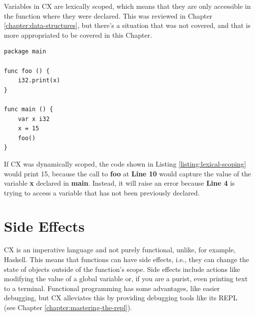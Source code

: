 \documentclass[11pt,fleqn,openany]{book} %
\begin{document}
Variables in CX are lexically scoped, which means that they are only accessible in the function where they were declared. This was reviewed in Chapter \ref{chapter:data-structures}, but there's a situation that was not covered, and that is more appropriated to be covered in this Chapter.

\begin{lstlisting}[caption={Lexical Scoping},captionpos=b,label={listing:lexical-scoping}]
package main

func foo () {
	i32.print(x)
}

func main () {
	var x i32
    x = 15
    foo()
}
\end{lstlisting}

If CX was dynamically scoped, the code shown in Listing \ref{listing:lexical-scoping} would print 15, because the call to \textbf{foo} at \textbf{Line 10} would capture the value of the variable \textbf{x} declared in \textbf{main}. Instead, it will raise an error because \textbf{Line 4} is trying to access a variable that has not been previously declared.

\section{Side Effects}


CX is an imperative language and not purely functional, unlike, for example, Haskell. This means that functions can have side effects, i.e., they can change the state of objects outside of the function's scope. Side effects include actions like modifying the value of a global variable or, if you are a purist, even printing text to a terminal. Functional programming has some advantages, like easier debugging, but CX alleviates this by providing debugging tools like its REPL (see Chapter \ref{chapter:mastering-the-repl}).%
\end{document}
